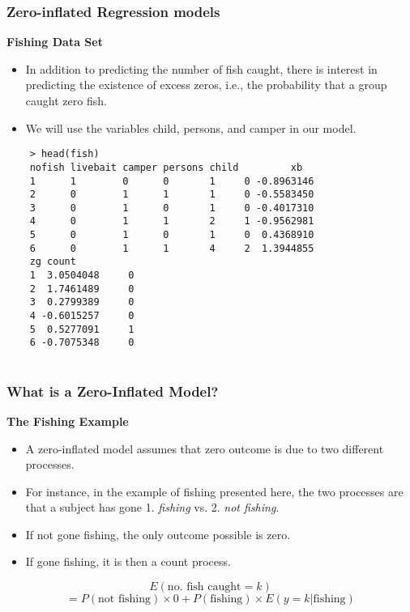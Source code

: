 \documentclass[MASTER.tex]{subfiles}
\begin{document}
\begin{frame}
\frametitle{Zero-inflated Regression models}
	\textbf{Fishing Data Set}
	\begin{itemize}
	\item In addition to predicting the number of fish caught, there is interest in predicting the existence of excess zeros, i.e., the probability that a group caught zero fish. 
	\item We will use the variables child, persons, and camper in our model.
	\end{itemize}
\end{frame}
\begin{frame}[fragile]
	\begin{verbatim}
	> head(fish)
	nofish livebait camper persons child         xb
	1      1        0      0       1     0 -0.8963146
	2      0        1      1       1     0 -0.5583450
	3      0        1      0       1     0 -0.4017310
	4      0        1      1       2     1 -0.9562981
	5      0        1      0       1     0  0.4368910
	6      0        1      1       4     2  1.3944855
	zg count
	1  3.0504048     0
	2  1.7461489     0
	3  0.2799389     0
	4 -0.6015257     0
	5  0.5277091     1
	6 -0.7075348     0
	
	\end{verbatim}
\end{frame}
\begin{frame}
\frametitle{What is a Zero-Inflated Model?}
\textbf{The Fishing Example}
\begin{itemize}
\item A zero-inflated model assumes that zero outcome is due to two different processes.

\item For instance, in the example of fishing presented here, the two processes are that a subject has gone 1. \textit{ fishing} vs. 2. \textit{not fishing}.
\item If not gone fishing, the only outcome possible is zero. 
\item If gone fishing, it is then a count process. 
\end{itemize}
\begin{framed}
\[E(\mbox{no. fish caught} =k) \]\[=P(\mbox{not fishing})\times 0+P( \mbox{fishing}) \times E(y=k| \mbox{fishing}) \]
\end{framed}
\end{frame}
 
\end{document}
